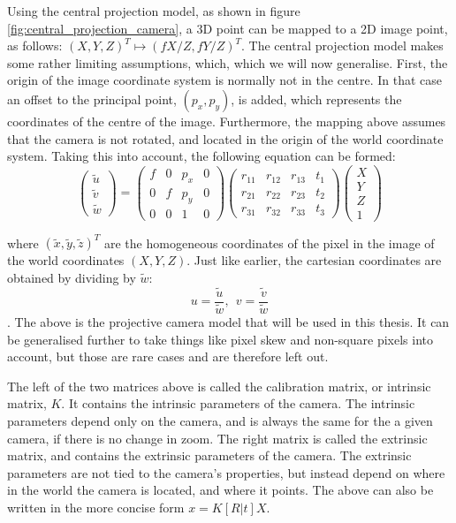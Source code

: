 Using the central projection model, as shown in figure \ref{fig:central_projection_camera}, a 3D point can be mapped to a 2D image point, as follows: $(X,Y,Z)^T\mapsto(fX/Z,fY/Z)^T$.
The central projection model makes some rather limiting assumptions, which, which we will now generalise.
First, the origin of the image coordinate system is normally not in the centre.
In that case an offset to the principal point, $(p_{x}, p_{y})$, is added, which represents the coordinates of the centre of the image.
Furthermore, the mapping above assumes that the camera is not rotated, and located in the origin of the world coordinate system. Taking this into account, the following equation can be formed:
$$
\begin{pmatrix}	\tilde{u}\\\tilde{v}\\\tilde{w}\end{pmatrix} = 
\begin{pmatrix}
	f & 0 & p_{x} & 0\\
	0 & f & p_{y} & 0\\
	0 & 0 & 1 & 0
\end{pmatrix}
\begin{pmatrix}
	r_{11} & r_{12} & r_{13} & t_{1}\\
	r_{21} & r_{22} & r_{23} & t_{2}\\
	r_{31} & r_{32} & r_{33} & t_{3}
\end{pmatrix}
\begin{pmatrix}	X\\Y\\Z\\1\end{pmatrix}
$$

where $(\tilde{x},\tilde{y},\tilde{z})^T$ are the homogeneous coordinates of the pixel in the image of the world coordinates $(X,Y,Z)$.
Just like earlier, the cartesian coordinates are obtained by dividing by $\tilde{w}$:
$$
u = \frac{\tilde{u}}{\tilde{w}},~~v = \frac{\tilde{v}}{\tilde{w}}
$$.
The above is the projective camera model that will be used in this thesis. 
It can be generalised further to take things like pixel skew and non-square pixels into account, but those are rare cases and are therefore left out.

The left of the two matrices above is called the calibration matrix, or intrinsic matrix, $K$.
It contains the intrinsic parameters of the camera.
The intrinsic parameters depend only on the camera, and is always the same for the a given camera, if there is no change in zoom.
The right matrix is called the extrinsic matrix, and contains the extrinsic parameters of the camera.
The extrinsic parameters are not tied to the camera's properties, but instead depend on where in the world the camera is located, and where it points.
The above can also be written in the more concise form $x = K[R|t]X$.

